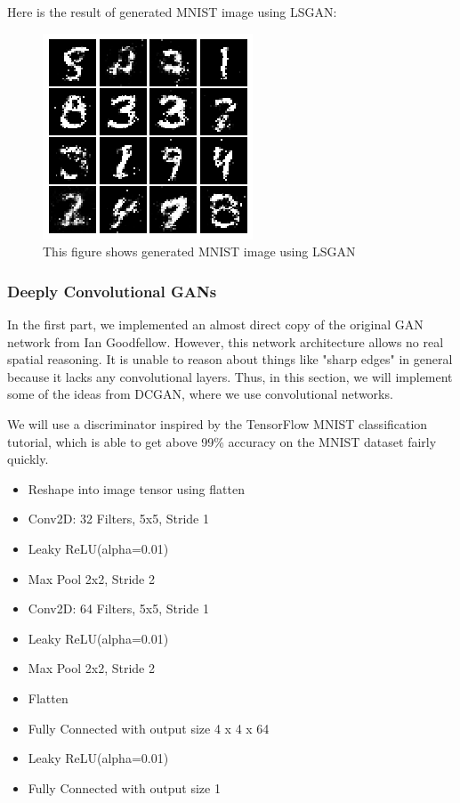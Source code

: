 \documentclass[10pt,twocolumn,letterpaper]{article}
\begin{document}
Here is the result of generated MNIST image using LSGAN: 
\begin{figure}[htpb]
\begin{center}
   \includegraphics[scale=1]{images/lsgan.png}
\end{center}
   \caption{\footnotesize This figure shows generated MNIST image using LSGAN}
\end{figure}

\subsubsection{Deeply Convolutional GANs}
In the first part, we implemented an almost direct copy of the original GAN network from Ian Goodfellow\cite{goodfellow2014generative}. However, this network architecture allows no real spatial reasoning. It is unable to reason about things like "sharp edges" in general because it lacks any convolutional layers. Thus, in this section, we will implement some of the ideas from DCGAN\cite{radford2016unsupervised}, where we use convolutional networks.

We will use a discriminator inspired by the TensorFlow MNIST classification tutorial, which is able to get above 99\% accuracy on the MNIST dataset fairly quickly. 
\begin{itemize}
    \item Reshape into image tensor using flatten
    \item Conv2D: 32 Filters, 5x5, Stride 1
    \item Leaky ReLU(alpha=0.01)
    \item Max Pool 2x2, Stride 2
    \item Conv2D: 64 Filters, 5x5, Stride 1
    \item Leaky ReLU(alpha=0.01)
    \item Max Pool 2x2, Stride 2
    \item Flatten
    \item Fully Connected with output size 4 x 4 x 64
    \item Leaky ReLU(alpha=0.01)
    \item Fully Connected with output size 1
\end{itemize}
\end{document}
